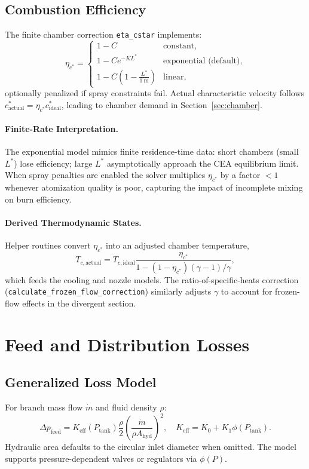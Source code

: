 \documentclass[12pt]{article}
\begin{document}
\subsection{Combustion Efficiency}
The finite chamber correction \verb|eta_cstar| implements:
\[
\eta_{c^*} =
\begin{cases}
1 - C & \text{constant}, \\
1 - C e^{-K L^*} & \text{exponential (default)}, \\
1 - C \left(1 - \frac{L^*}{1~\text{m}}\right) & \text{linear},
\end{cases}
\]
optionally penalized if spray constraints fail.  Actual characteristic velocity follows $c^*_{\text{actual}} = \eta_{c^*} c^*_{\text{ideal}}$, leading to chamber demand in Section~\ref{sec:chamber}.

\paragraph{Finite-Rate Interpretation.}  The exponential model mimics finite residence-time data: short chambers (small $L^*$) lose efficiency; large $L^*$ asymptotically approach the CEA equilibrium limit.  When spray penalties are enabled the solver multiplies $\eta_{c^*}$ by a factor $<1$ whenever atomization quality is poor, capturing the impact of incomplete mixing on burn efficiency.

\paragraph{Derived Thermodynamic States.}  Helper routines convert $\eta_{c^*}$ into an adjusted chamber temperature,
\[
T_{c,\text{actual}} = T_{c,\text{ideal}} \frac{\eta_{c^*}}{1 - (1 - \eta_{c^*})(\gamma - 1)/\gamma},
\]
which feeds the cooling and nozzle models.  The ratio-of-specific-heats correction (\verb|calculate_frozen_flow_correction|) similarly adjusts $\gamma$ to account for frozen-flow effects in the divergent section.

\section{Feed and Distribution Losses}
\label{sec:feed}

\subsection{Generalized Loss Model}
For branch mass flow $\dot{m}$ and fluid density $\rho$:
\[
\Delta p_{\text{feed}} = K_{\text{eff}}(P_{\text{tank}}) \frac{\rho}{2}
\left(\frac{\dot{m}}{\rho A_{\text{hyd}}}\right)^2,
\quad
K_{\text{eff}} = K_0 + K_1 \phi(P_{\text{tank}}).
\]
Hydraulic area defaults to the circular inlet diameter when omitted.  The model supports pressure-dependent valves or regulators via $\phi(P)$.
\end{document}
